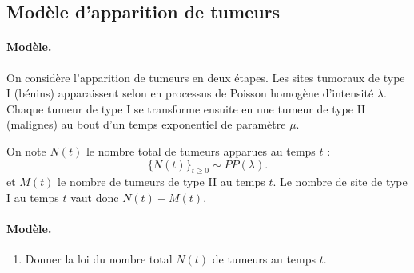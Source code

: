 \subsection{Modèle d'apparition de tumeurs}


\paragraph{Modèle.}
On considère l'apparition de tumeurs en deux étapes. Les sites tumoraux de type I (bénins) apparaissent selon en processus de Poisson homogène d'intensité $\lambda$. Chaque tumeur de type I se transforme ensuite en une tumeur de type II (malignes) au bout d'un temps exponentiel de paramètre $\mu$.

On note $N(t)$ le nombre total de tumeurs apparues au temps $t$ : 
$$
\{N(t)\}_{t \geq 0} \sim PP(\lambda).
$$
et $M(t)$ le nombre de tumeurs de type II au temps $t$. Le nombre de site de type I au temps $t$ vaut donc $N(t) - M(t)$.

\bigskip
\paragraph{Modèle.}
\begin{enumerate}
  \item Donner la loi du nombre total $N(t)$ de tumeurs au temps $t$.  
\end{enumerate}
